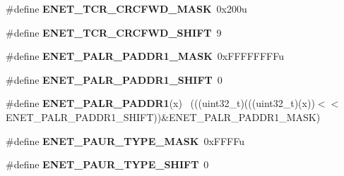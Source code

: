 \begin{DoxyCompactItemize}
\item 
\hypertarget{group___e_n_e_t___register___masks_gad9cf76ede816b109e58a7ad51288ef8f}{}\#define {\bfseries E\+N\+E\+T\+\_\+\+T\+C\+R\+\_\+\+C\+R\+C\+F\+W\+D\+\_\+\+M\+A\+S\+K}~0x200u\label{group___e_n_e_t___register___masks_gad9cf76ede816b109e58a7ad51288ef8f}

\item 
\hypertarget{group___e_n_e_t___register___masks_ga3332e52d1af57a1516fcb08b76c128ee}{}\#define {\bfseries E\+N\+E\+T\+\_\+\+T\+C\+R\+\_\+\+C\+R\+C\+F\+W\+D\+\_\+\+S\+H\+I\+F\+T}~9\label{group___e_n_e_t___register___masks_ga3332e52d1af57a1516fcb08b76c128ee}

\item 
\hypertarget{group___e_n_e_t___register___masks_gac4233569659da9e3d013421bd1e12b49}{}\#define {\bfseries E\+N\+E\+T\+\_\+\+P\+A\+L\+R\+\_\+\+P\+A\+D\+D\+R1\+\_\+\+M\+A\+S\+K}~0x\+F\+F\+F\+F\+F\+F\+F\+Fu\label{group___e_n_e_t___register___masks_gac4233569659da9e3d013421bd1e12b49}

\item 
\hypertarget{group___e_n_e_t___register___masks_gad11fbf90382ecfe565772e12e3997557}{}\#define {\bfseries E\+N\+E\+T\+\_\+\+P\+A\+L\+R\+\_\+\+P\+A\+D\+D\+R1\+\_\+\+S\+H\+I\+F\+T}~0\label{group___e_n_e_t___register___masks_gad11fbf90382ecfe565772e12e3997557}

\item 
\hypertarget{group___e_n_e_t___register___masks_ga8b0de0d9bcc4fd8e48fbac64c83c21e5}{}\#define {\bfseries E\+N\+E\+T\+\_\+\+P\+A\+L\+R\+\_\+\+P\+A\+D\+D\+R1}(x)                                        ~(((uint32\+\_\+t)(((uint32\+\_\+t)(x))$<$$<$E\+N\+E\+T\+\_\+\+P\+A\+L\+R\+\_\+\+P\+A\+D\+D\+R1\+\_\+\+S\+H\+I\+F\+T))\&E\+N\+E\+T\+\_\+\+P\+A\+L\+R\+\_\+\+P\+A\+D\+D\+R1\+\_\+\+M\+A\+S\+K)\label{group___e_n_e_t___register___masks_ga8b0de0d9bcc4fd8e48fbac64c83c21e5}

\item 
\hypertarget{group___e_n_e_t___register___masks_gac3d991850141898124542b0eafdd1419}{}\#define {\bfseries E\+N\+E\+T\+\_\+\+P\+A\+U\+R\+\_\+\+T\+Y\+P\+E\+\_\+\+M\+A\+S\+K}~0x\+F\+F\+F\+Fu\label{group___e_n_e_t___register___masks_gac3d991850141898124542b0eafdd1419}

\item 
\hypertarget{group___e_n_e_t___register___masks_ga52173426863fc14a746a5c85d5a3ac12}{}\#define {\bfseries E\+N\+E\+T\+\_\+\+P\+A\+U\+R\+\_\+\+T\+Y\+P\+E\+\_\+\+S\+H\+I\+F\+T}~0\label{group___e_n_e_t___register___masks_ga52173426863fc14a746a5c85d5a3ac12}


\end{DoxyCompactItemize}
